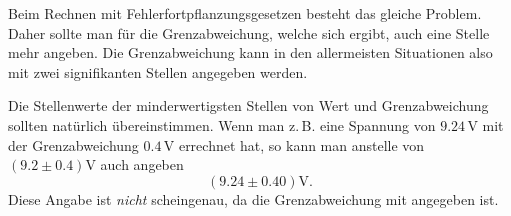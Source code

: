 \documentclass[a4paper,10pt,fleqn,twocolumn,twoside]{scrartcl}
\numberwithin{equation}{section}
\begin{document}
Beim Rechnen mit Fehlerfortpflanzungsgesetzen besteht das gleiche
Problem. Daher sollte man für die Grenzabweichung, welche sich ergibt,
auch eine Stelle mehr angeben. Die Grenzabweichung kann in den
allermeisten Situationen also mit zwei signifikanten Stellen angegeben
werden.

Die Stellenwerte der minderwertigsten Stellen von Wert und
Grenzabweichung sollten natürlich übereinstimmen.
Wenn man z.\,B. eine Spannung von $9.24\,\mathrm V$ mit der
Grenzabweichung $0.4\,\mathrm V$ errechnet hat, so kann man
anstelle von $(9.2\pm 0.4)\mathrm V$ auch angeben
\begin{equation}
(9.24\pm 0.40)\mathrm V.
\end{equation}
Diese Angabe ist \textit{nicht} scheingenau, da die Grenzabweichung
mit angegeben ist.
\end{document}
